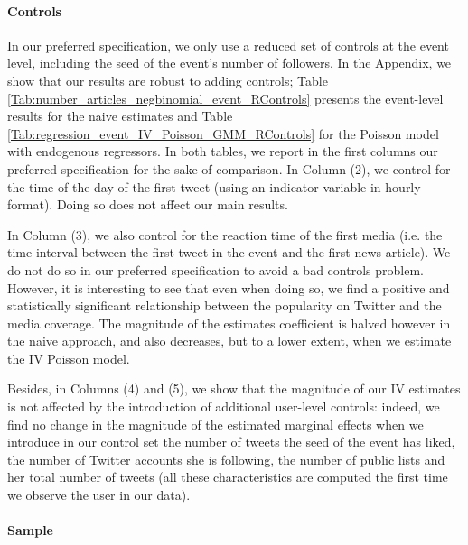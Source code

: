 \paragraph{Controls}

In our preferred specification, we only use a reduced set of controls at the event level, including the seed of the event's number of followers. In the \hyperlink{ref:Appendix}{Appendix}, we show that our results are robust to adding controls; Table \ref{Tab:number_articles_negbinomial_event_RControls} presents the event-level results for the naive estimates and Table \ref{Tab:regression_event_IV_Poisson_GMM_RControls} for the Poisson model with endogenous regressors. In both tables, we report in the first columns our preferred specification for the sake of comparison. In Column (2), we control for the time of the day of the first tweet (using an indicator variable in hourly format). Doing so does not affect our main results. 

In Column (3), we also control for the reaction time of the first media (i.e. the time interval between the first tweet in the event and the first news article). We do not do so in our preferred specification to avoid a bad controls problem. However, it is interesting to see that even when doing so, we find a positive and statistically significant relationship between the popularity on Twitter and the media coverage. The magnitude of the estimates coefficient is halved however in the naive approach, and also decreases, but to a lower extent, when we estimate the IV Poisson model.

Besides, in Columns (4) and (5), we show that the magnitude of our IV estimates is not affected by the introduction of additional user-level controls: indeed, we find no change in the magnitude of the estimated marginal effects when we introduce in our control set the number of tweets the seed of the event has liked, the number of Twitter accounts she is following, the number of public lists and her total number of tweets (all these characteristics are computed the first time we observe the user in our data). 


\paragraph{Sample}

